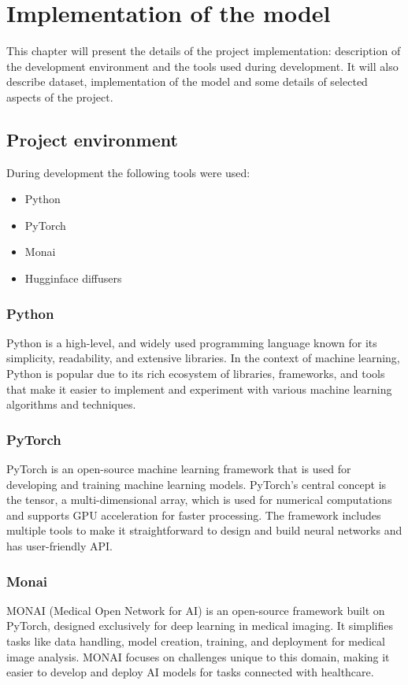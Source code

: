 \documentclass[11pt,a4paper]{report}
\begin{document}
\chapter{Implementation of the model}
This chapter will present the details of the project implementation: description of the development environment and the tools used during development. It will also describe dataset, implementation of the model and some details of selected aspects of the project.
\section{Project environment} %
During development the following tools were used:
\begin{itemize}
\item Python 
\item PyTorch
\item Monai
\item Hugginface diffusers 
\end{itemize}
\subsection{Python}
Python is a high-level, and widely used programming language known for its simplicity, readability, and extensive libraries. In the context of machine learning, Python is popular due to its rich ecosystem of libraries, frameworks, and tools that make it easier to implement and experiment with various machine learning algorithms and techniques. \cite{Python}
\subsection{PyTorch}
PyTorch is an open-source machine learning framework that is used for developing and training machine learning models. PyTorch's central concept is the tensor, a multi-dimensional array, which is used for numerical computations and supports GPU acceleration for faster processing. The framework includes multiple tools to make it straightforward to design and build neural networks and has user-friendly API. \cite{Pytorch}
\subsection{Monai}
MONAI (Medical Open Network for AI) is an open-source framework built on PyTorch, designed exclusively for deep learning in medical imaging. It simplifies tasks like data handling, model creation, training, and deployment for medical image analysis. MONAI focuses on challenges unique to this domain, making it easier to develop and deploy AI models for tasks connected with healthcare. \cite{Monai}
\end{document}

